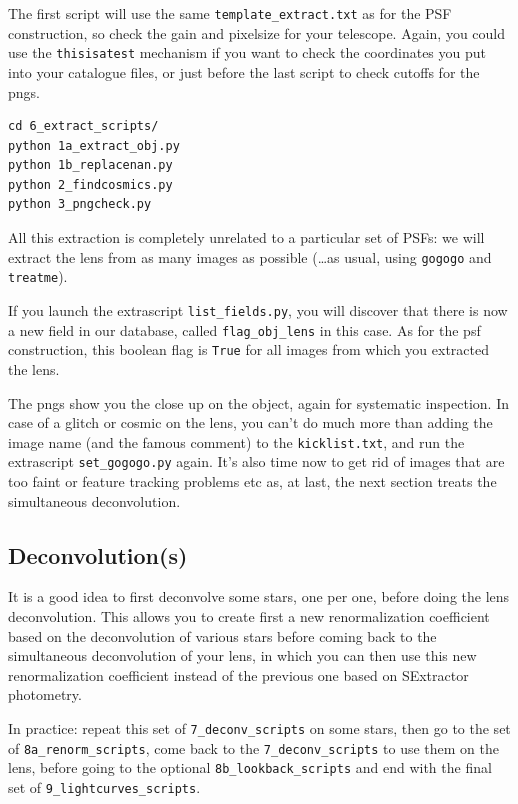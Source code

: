 The first script will use the same \verb+template_extract.txt+ as for the PSF construction, so check the gain and pixelsize for your telescope. Again, you could use the \verb+thisisatest+ mechanism if you want to check the coordinates you put into your catalogue files, or just before the last script to check cutoffs for the pngs.

\begin{Verbatim}
cd 6_extract_scripts/
python 1a_extract_obj.py
python 1b_replacenan.py
python 2_findcosmics.py
python 3_pngcheck.py
\end{Verbatim}

All this extraction is completely unrelated to a particular set of PSFs: we will extract the lens from as many images as possible (\ldots as usual, using \verb+gogogo+ and \verb+treatme+).

If you launch the extrascript \verb+list_fields.py+, you will discover that there is now a new field in our database, called \verb+flag_obj_lens+ in this case. As for the psf construction, this boolean flag is \verb+True+ for all images from which you extracted the lens.

The pngs show you the close up on the object, again for systematic inspection. In case of a glitch or cosmic on the lens, you can't do much more than adding the image name (and the famous comment) to the \verb+kicklist.txt+, and run the extrascript \verb+set_gogogo.py+ again. It's also time now to get rid of images that are too faint or feature tracking problems etc as, at last, the next section treats the simultaneous deconvolution.

\subsection{Deconvolution(s)}

It is a good idea to first deconvolve some stars, one per one, before doing the lens deconvolution. This allows you to create first a new renormalization coefficient based on the deconvolution of various stars before coming back to the simultaneous deconvolution of your lens, in which you can then use this new renormalization coefficient instead of the previous one based on SExtractor photometry.

In practice: repeat this set of \verb+7_deconv_scripts+ on some stars, then go to the set of \verb+8a_renorm_scripts+, come back to the \verb+7_deconv_scripts+ to use them on the lens, before going to the optional \verb+8b_lookback_scripts+ and end with the final set of \verb+9_lightcurves_scripts+.

